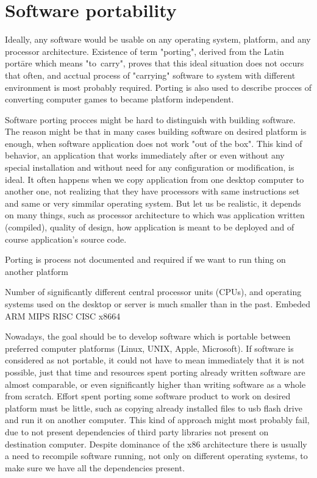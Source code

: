 \chapter{Software portability}\label{porting}

Ideally, any software would be usable on any operating system, platform, and any processor architecture.
Existence of term "porting", derived from the Latin portāre which means "to~carry", proves that this ideal situation does not occurs that often, and acctual process of "carrying" software to system with different environment is most probably required.
Porting is also used to describe procces of converting computer games to became platform independent.

Software porting procces might be hard to distinguish with building software.
The reason might be that in many cases building software on desired platform is enough, when software application does not work "out of the box".
This kind of behavior, an application that works immediately after or even without any special installation and without need for any configuration or modification, is ideal.
It often happens when we copy application from one desktop computer to another one, not realizing that they have processors with same instructions set and same or very simmilar operating system.
But let us be realistic, it depends on many things, such as processor architecture to which was application written (compiled), quality of design, how application is meant to be deployed and of course application's source code.

Porting is process not documented and required if we want to run thing on another platform \cite{porting_software}

Number of significantly different central processor units (CPUs), and operating systems used on the desktop or server is much smaller than in the past. 
Embeded ARM MIPS  RISC CISC x8664

Nowadays, the goal should be to develop software which is portable between preferred computer platforms (Linux, UNIX, Apple, Microsoft).
If software is considered as not portable, it could not have to mean immediately that it is not possible, just that time and resources spent porting already written software are almost comparable, or even significantly higher than writing software as a whole from scratch.
Effort spent porting some software product to work on desired platform must be little, such as copying already installed files to usb flash drive and run it on another computer.
This kind of approach might most probably fail, due to not present dependencies of third party libraries not present on destination computer.
Despite dominance of the x86 architecture there is usually a need to recompile software running, not only on different operating systems, to make sure we have all the dependencies present.

